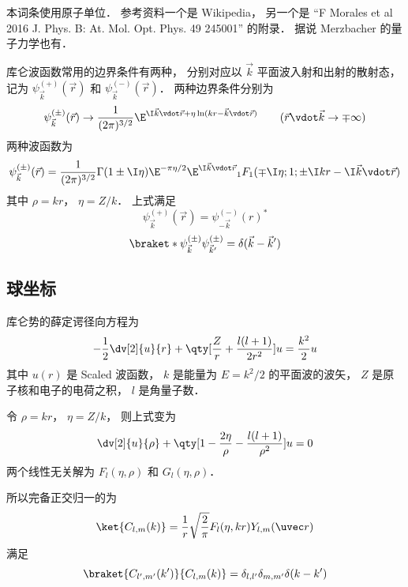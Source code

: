
本词条使用原子单位． 参考资料一个是 Wikipedia， 另一个是 “F Morales et al 2016 J. Phys. B: At. Mol. Opt. Phys. 49 245001” 的附录． 据说 Merzbacher 的量子力学也有．

库仑波函数常用的边界条件有两种， 分别对应以 $\vec k$ 平面波入射和出射的散射态， 记为 $\psi_{\vec k}^{(+)}(\vec r)$ 和 $\psi_{\vec k}^{(-)}(\vec r)$． 两种边界条件分别为
\begin{equation}
\psi_{\vec k}^{(\pm)}(\vec r) \to \frac{1}{(2\pi)^{3/2}} \E^{\I\vec k\vdot\vec r + \eta\ln (kr - \vec k \vdot\vec r)}
\qquad
(\vec r\vdot \vec k \to \mp\infty)
\end{equation}
两种波函数为
\begin{equation}
\psi_{\vec k}^{(\pm)}(\vec r) = \frac{1}{(2\pi)^{3/2}} \Gamma(1\pm \I\eta)\E^{-\pi\eta/2} \E^{\I\vec k\vdot\vec r} {_1F_1}(\mp\I\eta; 1; \pm\I kr - \I \vec k\vdot \vec r)
\end{equation}
其中 $\rho = kr$， $\eta = Z/k$． 上式满足
\begin{equation}
\psi_{\vec k}^{(+)}(\vec r) = \psi_{-\vec k}^{(-)}(r)^*
\end{equation}
\begin{equation}
\braket*{\psi_{\vec k}^{(\pm)}}{\psi_{\vec k'}^{(\pm)}} = \delta(\vec k - \vec k')
\end{equation}

\subsection{球坐标}
库仑势的薛定谔径向方程为
\begin{equation}
-\frac12 \dv[2]{u}{r} + \qty[\frac{Z}{r} + \frac{l(l+1)}{2 r^2}]u = \frac{k^2}{2}u
\end{equation}
其中 $u(r)$ 是 Scaled 波函数， $k$ 是能量为 $E = k^2/2$ 的平面波的波矢， $Z$ 是原子核和电子的电荷之积， $l$ 是角量子数．

令 $\rho = kr$， $\eta = Z/k$， 则上式变为
\begin{equation}
\dv[2]{u}{\rho} + \qty[1 - \frac{2\eta}{\rho} - \frac{l(l+1)}{\rho^2}]u = 0
\end{equation}
两个线性无关解为 $F_l(\eta, \rho)$ 和 $G_l(\eta, \rho)$．

所以完备正交归一的为
\begin{equation}
\ket{C_{l,m}(k)} = \frac{1}{r} \sqrt{\frac{2}{\pi}} F_l(\eta, kr) Y_{l,m}(\uvec r)
\end{equation}
满足
\begin{equation}
\braket{C_{l',m'}(k')}{C_{l,m}(k)} = \delta_{l,l'}\delta_{m,m'}\delta(k-k')
\end{equation}

